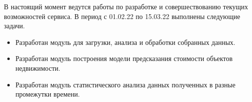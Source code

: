 \Introduction

В настоящий момент ведутся работы по разработке и совершествованию текущих возможностей сервиса. В период с 01.02.22 по 15.03.22 выполнены следующие задачи. 

\begin{itemize}
\item Разработан модуль для загрузки, анализа и обработки собранных данных. 
\item Разработан модуль построения модели предсказания стоимости объектов недвижимости. 
\item Разработан модуль статистического анализа данных полученных в разные промежутки времени.
\end{itemize}


